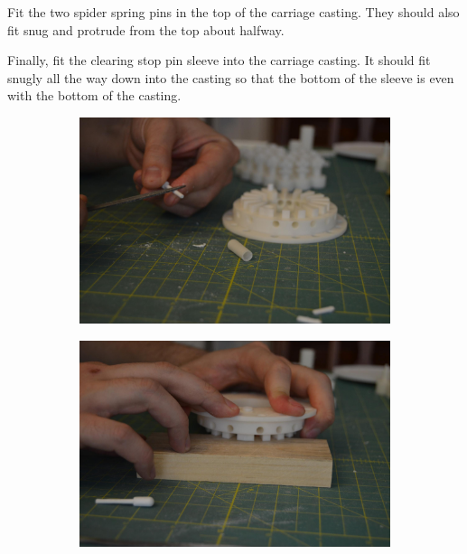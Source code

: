 \documentclass[openany]{book}
\begin{document}
Fit the two spider spring pins in the top of the carriage casting. They should also fit snug and protrude from the top about halfway.

Finally, fit the clearing stop pin sleeve into the carriage casting. It should fit snugly all the way down into the casting so that the bottom of the sleeve is even with the bottom of the casting.

\begin{figure}[!ht]
	\centering
	\begin{subfigure}{.4\textwidth}
		\centering
		\includegraphics[width=.95\textwidth]{images/image31.jpg}
		\caption{}
		\label{fig:image31}	
	\end{subfigure}
	\begin{subfigure}{.4\textwidth}
		\centering
		\includegraphics[width=.95\textwidth]{images/image10.jpg}
		\caption{}
		\label{fig:image10}	
	\end{subfigure}
	\caption{}
\end{figure}
\end{document}
